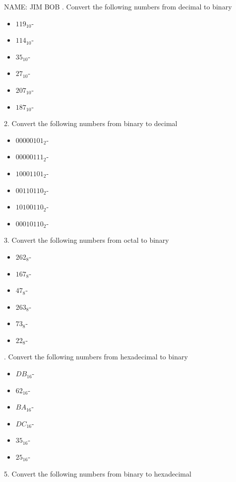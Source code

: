 \documentclass[a4paper,12pt]{article}
\begin{document}
NAME: JIM BOB
\newline{}. Convert the following numbers from decimal to binary
\begin{itemize}
\item $119_{10}$\quad - 
\item $114_{10}$\quad - 
\item $35_{10}$\quad - 
\item $27_{10}$\quad - 
\item $207_{10}$\quad - 
\item $187_{10}$\quad - 
\end{itemize}
2. Convert the following numbers from binary to decimal 
\begin{itemize}
\item $00000101_{2}$\quad - 
\item $00000111_{2}$\quad - 
\item $10001101_{2}$\quad - 
\item $00110110_{2}$\quad - 
\item $10100110_{2}$\quad - 
\item $00010110_{2}$\quad - 
\end{itemize}
3. Convert the following numbers from octal to binary 
\begin{itemize}
\item $262_{8}$\quad - 
\item $167_{8}$\quad - 
\item $47_{8}$\quad - 
\item $263_{8}$\quad - 
\item $73_{8}$\quad - 
\item $22_{8}$\quad - 
\end{itemize}. Convert the following numbers from hexadecimal to binary 
\begin{itemize}
\item $DB_{16}$\quad - 
\item $62_{16}$\quad - 
\item $BA_{16}$\quad - 
\item $DC_{16}$\quad - 
\item $35_{16}$\quad - 
\item $25_{16}$\quad - 
\end{itemize}
5. Convert the following numbers from binary to hexadecimal 
\end{document}
